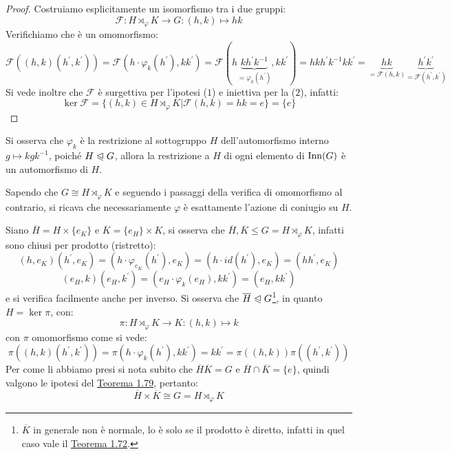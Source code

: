 \documentclass[11pt]{scrartcl}
\begin{document}
\begin{proof}
    Costruiamo esplicitamente un isomorfismo tra i due gruppi:
        \[ \mathcal{F} : H \rtimes_{\varphi} K \longrightarrow G : (h,k) \longmapsto hk
            \]
    Verifichiamo che è un omomorfismo:
        \[
            \mathcal{F}((h,k)(h^{\prime},k^{\prime})) = \mathcal{F}(h\cdot \varphi_k(h^{\prime}),kk^{\prime}) = \mathcal{F}(h\underbrace{kh^{\prime}k^{-1}}_{= \varphi_k(h^{\prime})},kk^{\prime})
            = hkh^{\prime}k^{-1}kk^{\prime} = \underbrace{hk}_{= \mathcal{F}(h,k)}\underbrace{h^{\prime}k^{\prime}}_{= \mathcal{F}(h^{\prime},k^{\prime})}
        \]
    Si vede inoltre che $\mathcal{F}$ è surgettiva per l'ipotesi ($1$) e iniettiva per la ($2$), infatti:
        \[ \ker\mathcal{F} = \{(h,k) \in  H \rtimes_{\varphi} K | \mathcal{F}(h,k) = hk = e\} = \{e\}
            \]
\end{proof}

\begin{remark}
    Si osserva che $\varphi_k$ è la restrizione al sottogruppo $H$ dell'automorfismo interno $g \longmapsto kgk^{-1}$, poiché
    $H \trianglelefteqslant G$, allora la restrizione a $H$ di ogni elemento di $\operatorname{Inn}(G)$ è un automorfismo di $H$.
\end{remark}

\begin{remark}
    Sapendo che $G \cong H \rtimes_{\varphi} K$ e seguendo i passaggi della verifica di omomorfismo al contrario, si ricava che necessariamente $\varphi$ è esattamente
    l'azione di coniugio su $H$.
\end{remark}

\pagebreak

\begin{remark}
    Siano $\overline H = H \times \{e_K\}$ e $\overline K = \{e_H\} \times K$, si osserva che $\overline H, \overline K \leqslant G = H \rtimes_{\varphi} K$, infatti sono chiusi per prodotto (ristretto):
        \[ (h,e_K)(h^{\prime},e_K) = (h \cdot \varphi_{e_K}(h^{\prime}), e_K) = (h \cdot id(h^{\prime}), e_K) = (hh^{\prime},e_K)
        \]\[ (e_H,k)(e_H,k^{\prime}) = (e_H \cdot \varphi_k(e_H), kk^{\prime}) = (e_H,kk^{\prime})
            \]
    e si verifica facilmente anche per inverso. Si osserva che $\overline H \trianglelefteqslant G$\footnote{$\overline K$ in generale non è normale, lo è solo se il prodotto è diretto, infatti in quel caso vale il \hyperref[t:1.72]{Teorema 1.72}.},
    in quanto $H = \ker \pi$, con:
        \[ \pi : H \rtimes_{\varphi} K \longrightarrow K: (h,k) \longmapsto k
            \]
    con $\pi$ omomorfismo come si vede:
        \[ \pi((h,k)(h^{\prime},k^{\prime})) = \pi(h \cdot \varphi_k(h^{\prime}),kk^{\prime}) = kk^{\prime} = \pi((h,k))\pi((h^{\prime},k^{\prime}))
            \]
    Per come li abbiamo presi si nota subito che $\overline H \overline K = G$ e $\overline H \cap \overline K = \{e\}$, quindi valgono le ipotesi del \hyperref[t:1.79]{Teorema 1.79}, pertanto:
        \[ \overline H \times \overline K \cong G = H \rtimes_{\varphi} K
            \]
\end{remark}
\end{document}
